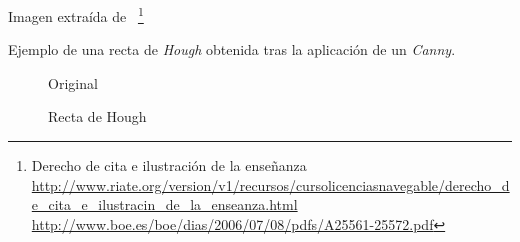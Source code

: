 Imagen extraída de \emph{\citep*{opencv_book-bib}}~\footnote{Derecho
  de
  cita e ilustración de la enseñanza\\
  \url{http://www.riate.org/version/v1/recursos/cursolicenciasnavegable/derecho_de_cita_e_ilustracin_de_la_enseanza.html}\\
  \url{http://www.boe.es/boe/dias/2006/07/08/pdfs/A25561-25572.pdf}}

Ejemplo de una recta de \emph{Hough} obtenida tras la aplicación de un
\emph{Canny}.

\begin{figure}[H]
  \caption{Original}
  \centering \setlength\fboxsep{0pt} \setlength\fboxrule{0.5pt}
\end{figure}

\begin{figure}[H]
  \centering \setlength\fboxsep{0pt} \setlength\fboxrule{0.5pt}
  \caption{Recta de Hough}
\end{figure}

